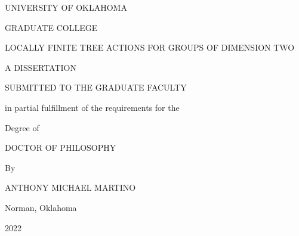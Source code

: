 \documentclass[12pt,parskip=full]{report}
\theoremstyle{plain}
\theoremstyle{definition}
\begin{document}



{%

{\singlespacing

\newpage
\thispagestyle{empty}
\begin{center}
{ %
\uppercase{UNIVERSITY OF OKLAHOMA}
\par
\vspace{0.16in}
\uppercase{GRADUATE COLLEGE}
\par
\vspace{1.2in}
\uppercase{locally finite tree actions for groups of dimension two} 
\par
\vspace{0.17in}
\par
\vspace{1.2in}
\uppercase{A dissertation}
\par
\vspace{0.17in}
\uppercase{Submitted to the graduate faculty}
\par
\vspace{0.17in}
in partial fulfillment of the requirements for the
\par
\vspace{0.17in}
Degree of
\par
\vspace{0.17in}
\uppercase{Doctor of Philosophy}
\par
\vfill
By
\par
\vspace{0.17in}
\uppercase{Anthony Michael Martino}
\par
Norman, Oklahoma
\par
2022
}
\end{center}


}}
\end{document}
